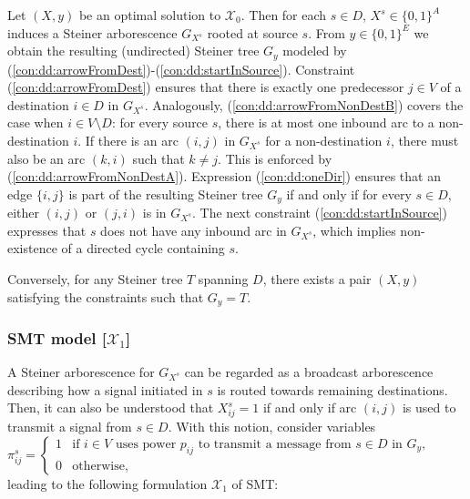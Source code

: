 Let $(X,y)$ be an optimal solution to $\mathcal{X}_0$.
Then for each $s\in D$, $X^s\in \{0,1\}^{A}$ induces a Steiner arborescence $G_{X^s}$ rooted at source $s$.
From $y\in \{0,1\}^E$ we obtain the resulting (undirected) Steiner tree $G_{y}$ modeled by (\ref{con:dd:arrowFromDest})-(\ref{con:dd:startInSource}).
Constraint (\ref{con:dd:arrowFromDest}) ensures that there is exactly one predecessor $j\in V$ of a destination $i\in D$ in $G_{X^s}$.
Analogously, (\ref{con:dd:arrowFromNonDestB}) covers the case when $i \in V\setminus D$: for every source $s$, there is at most one inbound arc to a non-destination $i$.
If there is an arc $(i,j)$ in $G_{X^s}$ for a non-destination $i$, there must also be an arc $(k,i)$ such that $k\neq j$.
This is enforced by (\ref{con:dd:arrowFromNonDestA}).
Expression (\ref{con:dd:oneDir}) ensures that an edge $\{i,j\}$ is part of the resulting Steiner tree $G_{y}$ if and only if for every $s\in D$, either $(i,j)$ or $(j,i)$ is in $G_{X^s}$.
The next constraint (\ref{con:dd:startInSource}) expresses that $s$ does not have any inbound arc in $G_{X^s}$, which implies non-existence of a directed cycle containing $s$.

Conversely, for any Steiner tree $T$ spanning $D$, there exists a pair $(X,y)$ satisfying the constraints such that $G_y=T$. 

\subsubsection{SMT model [$\mathcal{X}_1$]}

A Steiner arborescence for $G_{X^s}$ can be regarded as a broadcast arborescence describing how a signal initiated in $s$ is routed towards remaining destinations. 
Then, it can also be understood that $X_{ij}^s=1$ if and only if arc $(i,j)$ is used to transmit a signal from $s\in D$.
With this notion, consider variables
\newline\newline
$\pi^s_{ij}=
\begin{cases}
    1 & \text{if $i\in V$ uses power $p_{ij}$ to transmit a message from $s\in D$ in $G_y$},\\
    0 & \text{otherwise},
  \end{cases}$
\newline\newline
leading to the following formulation $\mathcal{X}_1$ of SMT:

